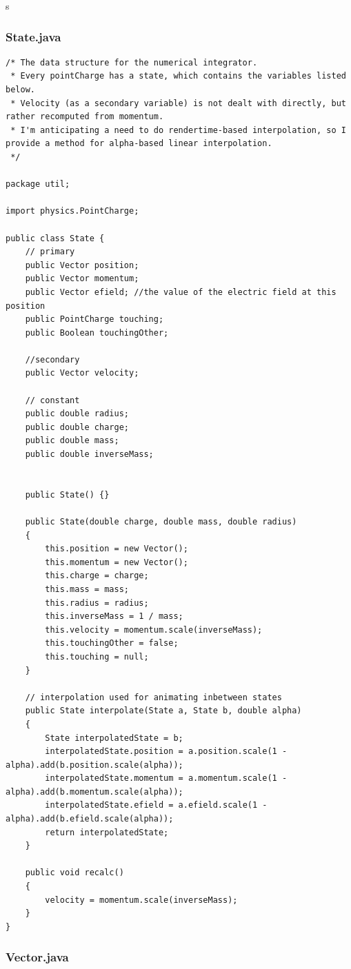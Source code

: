 s\documentclass[10pt]{article}
\begin{document}
\subsubsection{State.java}

\begin{verbatim}
/* The data structure for the numerical integrator.
 * Every pointCharge has a state, which contains the variables listed below.
 * Velocity (as a secondary variable) is not dealt with directly, but rather recomputed from momentum.
 * I'm anticipating a need to do rendertime-based interpolation, so I provide a method for alpha-based linear interpolation.
 */

package util;

import physics.PointCharge;

public class State {
	// primary
	public Vector position;
	public Vector momentum;
	public Vector efield; //the value of the electric field at this position
	public PointCharge touching;
	public Boolean touchingOther;

	//secondary
	public Vector velocity;
	
	// constant
	public double radius;
	public double charge;
	public double mass;
	public double inverseMass;


	public State() {}

	public State(double charge, double mass, double radius) 
	{
		this.position = new Vector();
		this.momentum = new Vector();
		this.charge = charge;
		this.mass = mass;
		this.radius = radius;
		this.inverseMass = 1 / mass;
		this.velocity = momentum.scale(inverseMass);
		this.touchingOther = false;
		this.touching = null;
	}

	// interpolation used for animating inbetween states
	public State interpolate(State a, State b, double alpha) 
	{
		State interpolatedState = b;
		interpolatedState.position = a.position.scale(1 - alpha).add(b.position.scale(alpha));
		interpolatedState.momentum = a.momentum.scale(1 - alpha).add(b.momentum.scale(alpha));
		interpolatedState.efield = a.efield.scale(1 - alpha).add(b.efield.scale(alpha));
		return interpolatedState;
	}
	
	public void recalc()
	{
		velocity = momentum.scale(inverseMass);
	}
}
\end{verbatim}

\subsubsection{Vector.java}
\end{document}
